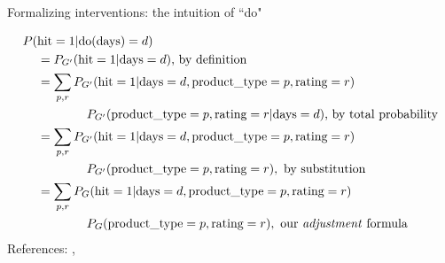 \begin{frame}{Formalizing interventions: the intuition of ``do"}
    \vspace{-1.5cm}
    \vspace{-2.5cm}
    \begin{align*}
        P(&\textrm{hit}=1 | \mathrm{do}(\textrm{days})=d) \\
        & = P_{G'}(\textrm{hit}=1 | \textrm{days}=d) \textrm{, by definition} \\
        & = \sum_{p, r} P_{G'}(\textrm{hit}=1 | \textrm{days}=d, \textrm{product\_type} = p, \textrm{rating} = r) \\
        & \qquad  \qquad P_{G'}(\textrm{product\_type} = p, \textrm{rating} = r | \textrm{days}=d)\textrm{, by total probability} \\
        & = \sum_{p, r} P_{G'}(\textrm{hit}=1 | \textrm{days}=d, \textrm{product\_type} = p, \textrm{rating} = r) \\
        & \qquad  \qquad P_{G'}(\textrm{product\_type} = p, \textrm{rating} = r), \textrm{ by substitution} \\
        & =  \sum_{p, r} P_{G}(\textrm{hit}=1 | \textrm{days}=d, \textrm{product\_type} = p, \textrm{rating} = r) \\
        & \qquad  \qquad P_{G}(\textrm{product\_type} = p, \textrm{rating} = r), \textrm{ our \emph{adjustment} formula}
    \end{align*}
    References: \cite{pearl2016causal}, \cite{chmp}
\end{frame}

